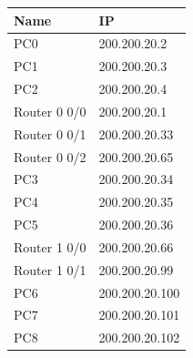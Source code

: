 \documentclass[a4paper,11pt]{article}
\begin{document}
\begin{enumerate}
            \begin{table}[H]
                  \centering
                  \begin{tabular}{| m{15em}| m{9em}|}
                        \hline
                        {\cellcolor[rgb]{0.324,0.553,0.912}} \textbf{Name } & \textbf
                        {IP}                                                                 \\
                        \hline
                        {\cellcolor[rgb]{0.324,0.553,0.912}}PC0             & 200.200.20.2   \\
                        \hline
                        {\cellcolor[rgb]{0.324,0.553,0.912}}PC1             & 200.200.20.3   \\
                        \hline
                        {\cellcolor[rgb]{0.324,0.553,0.912}}PC2             & 200.200.20.4   \\
                        \hline
                        {\cellcolor[rgb]{0.324,0.553,0.912}}{Router 0 0/0}  & 200.200.20.1   \\
                        \hline
                        {\cellcolor[rgb]{0.324,0.553,0.912}}{Router 0 0/1}  & 200.200.20.33  \\
                        \hline
                        {\cellcolor[rgb]{0.324,0.553,0.912}}{Router 0 0/2}  & 200.200.20.65  \\
                        \hline
                        {\cellcolor[rgb]{0.324,0.553,0.912}}PC3             & 200.200.20.34  \\
                        \hline
                        {\cellcolor[rgb]{0.324,0.553,0.912}}PC4             & 200.200.20.35  \\
                        \hline
                        {\cellcolor[rgb]{0.324,0.553,0.912}}PC5             & 200.200.20.36  \\
                        \hline
                        {\cellcolor[rgb]{0.324,0.553,0.912}}{Router 1 0/0}  & 200.200.20.66  \\
                        \hline
                        {\cellcolor[rgb]{0.324,0.553,0.912}}{Router 1 0/1}  & 200.200.20.99  \\
                        \hline
                        {\cellcolor[rgb]{0.324,0.553,0.912}}PC6             & 200.200.20.100 \\
                        \hline
                        {\cellcolor[rgb]{0.324,0.553,0.912}}PC7             & 200.200.20.101 \\
                        \hline
                        {\cellcolor[rgb]{0.324,0.553,0.912}}PC8             & 200.200.20.102 \\
                        \hline
                  \end{tabular}
            \end{table}



\end{enumerate}
\end{document}

